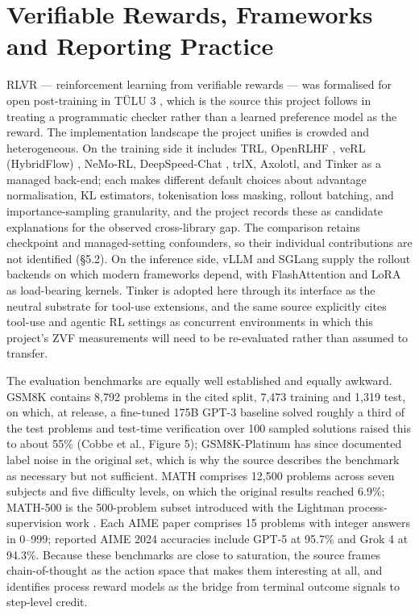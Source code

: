\documentclass[12pt,a4paper]{report}
\DeclareRobustCommand{\longtok}[1]{\texttt{\seqsplit{#1}}}
\begin{document}
\section{Verifiable Rewards, Frameworks and Reporting
Practice}\label{verifiable-rewards-frameworks-and-reporting-practice}

RLVR --- reinforcement learning from verifiable rewards --- was
formalised for open post-training in TÜLU 3 \citep{lambert2024tulu3},
which is the source this project follows in treating a programmatic
checker rather than a learned preference model as the reward. The
implementation landscape the project unifies is crowded and
heterogeneous. On the training side it includes TRL, OpenRLHF
\citep{hu2024openrlhf}, veRL (HybridFlow) \citep{sheng2025hybridflow},
NeMo-RL, DeepSpeed-Chat \citep{yao2023deepspeedchat}, trlX, Axolotl, and
Tinker as a managed back-end; each makes different default choices about
advantage normalisation, KL estimators, tokenisation loss masking,
rollout batching, and importance-sampling granularity, and the project
records these as candidate explanations for the observed cross-library
gap. The comparison retains checkpoint and managed-setting confounders,
so their individual contributions are not identified (§5.2). On the
inference side, vLLM \citep{kwon2023vllm} and SGLang
\citep{zheng2024sglang} supply the rollout backends on which modern
frameworks depend, with FlashAttention \citep{dao2022flashattention} and
LoRA \citep{hu2021lora} as load-bearing kernels. Tinker is adopted here
through its \longtok{message\_\allowbreak{}with\_\allowbreak{}tool} interface as the neutral
substrate for tool-use extensions, and the same source explicitly cites
tool-use and agentic RL settings as concurrent environments in which
this project's ZVF measurements will need to be re-evaluated rather than
assumed to transfer.

The evaluation benchmarks are equally well established and equally
awkward. GSM8K \citep{cobbe2021gsm8k} contains 8,792 problems in the
cited split, 7,473 training and 1,319 test, on which, at release, a
fine-tuned 175B GPT-3 baseline solved roughly a third of the test
problems and test-time verification over 100 sampled solutions raised
this to about 55\% (Cobbe et al., Figure 5); GSM8K-Platinum
\citep{vendrow2025platinum} has since documented label noise in the
original set, which is why the source describes the benchmark as
necessary but not sufficient. MATH \citep{hendrycks2021math} comprises
12,500 problems across seven subjects and five difficulty levels, on
which the original results reached 6.9\%; MATH-500 is the 500-problem
subset introduced with the Lightman process-supervision work
\citep{lightman2023lets}. Each AIME paper comprises 15 problems with
integer answers in 0--999; reported AIME 2024 accuracies include GPT-5
at 95.7\% and Grok 4 at 94.3\%. Because these benchmarks are close to
saturation, the source frames chain-of-thought as the action space that
makes them interesting at all, and identifies process reward models as
the bridge from terminal outcome signals to step-level credit.
\end{document}
